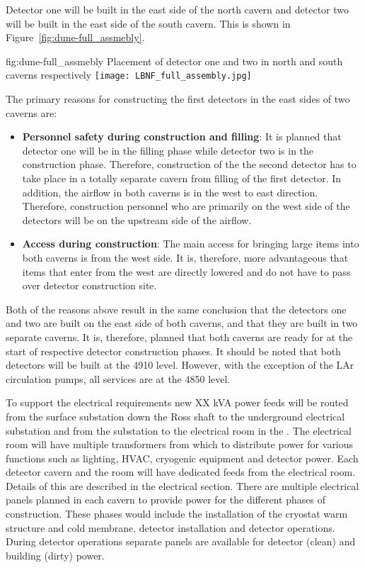 Detector one will be built in the east side of the north cavern and
detector two will be built in the east side of the south cavern. This
is shown in Figure~\ref{fig:dune-full_assmebly}.
\begin{dunefigure}{fig:dune-full_assmebly}
  {Placement of detector one and two in north and south caverns respectively}
  \texttt{[image: LBNF\_full\_assembly.jpg]}
\end{dunefigure}
The primary reasons for constructing the first detectors in the east
sides of two caverns are:
\begin{itemize}
\item {\bf Personnel safety during construction and filling}: It is
  planned that detector one will be in the filling phase while detector
  two is in the construction phase. Therefore, construction of the the
  second detector has to take place in a totally separate cavern from
  filling of the first detector. In addition, the airflow in both
  caverns is in the west to east direction. Therefore, construction
  personnel who are primarily on the west side of the detectors will
  be on the upstream side of the airflow.
\item{\bf Access during construction}: The main access for bringing
  large items into both caverns is from the west side. It is,
  therefore, more advantageous that items that enter from the west are
  directly lowered and do not have to pass over detector construction
  site.
\end{itemize}
Both of the reasons above result in the same conclusion that the
detectors one and two are built on the east side of both caverns, and
that they are built in two separate caverns. It is, therefore, planned
that both caverns are ready for  at the start of
respective detector construction phases.  It should be noted that both
detectors will be built at the 4910 level. However, with the exception
of the LAr circulation pumps, all services are at the 4850 level.

To support the electrical requirements new XX kVA power feeds will be
routed from the surface substation down the Ross shaft to the
underground electrical substation and from the substation to the
electrical room in the .  The electrical room will have multiple
transformers from which to distribute power for various functions such
as lighting, HVAC, cryogenic equipment and detector power.  Each
detector cavern and the  room will have dedicated feeds from the
electrical room.  Details of this are described in the electrical
section.  There are multiple electrical panels planned in each cavern
to provide power for the different phases of construction.  These
phases would include the installation of the cryostat warm structure
and cold membrane, detector installation and detector
operations. During detector operations separate panels are available
for detector (clean) and building (dirty) power.

